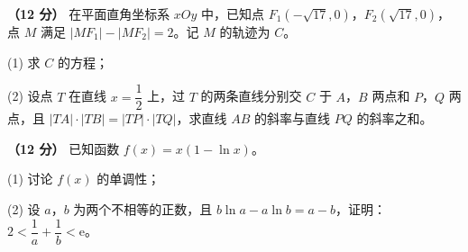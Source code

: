 \begin{question}
\textbf{（12 分）} 在平面直角坐标系 $xOy$ 中，已知点 $F_1\left(-\sqrt{17},0\right)$，$F_2\left(\sqrt{17},0\right)$，点 $M$ 满足 $\left|MF_1\right|-\left|MF_2\right|=2$。记 $M$ 的轨迹为 $C$。

  (1) 求 $C$ 的方程；

  (2) 设点 $T$ 在直线 $x=\dfrac12$ 上，过 $T$ 的两条直线分别交 $C$ 于 $A$，$B$ 两点和 $P$，$Q$ 两点，且 $|TA|\cdot|TB|=|TP|\cdot|TQ|$，求直线 $AB$ 的斜率与直线 $PQ$ 的斜率之和。

\end{question}
\begin{question}
\textbf{（12 分）} 已知函数 $f(x)=x(1-\ln x)$。

  (1) 讨论 $f(x)$ 的单调性；

  (2) 设 $a$，$b$ 为两个不相等的正数，且 $b\ln a-a\ln b=a-b$，证明：$2<\dfrac1a+\dfrac1b<\mathrm e$。

\par\medskip


\end{question}